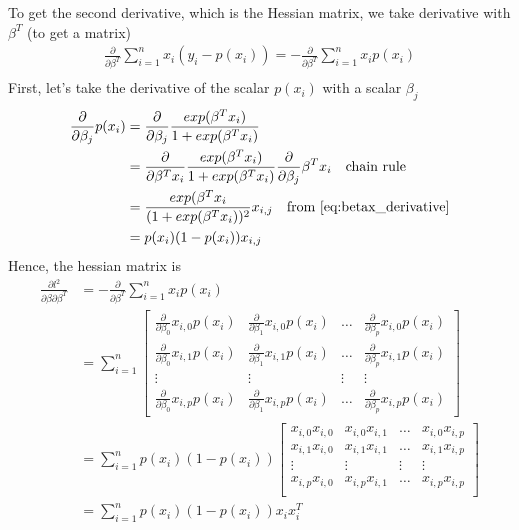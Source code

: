 \documentclass[../statistical_learning_notes.tex]{subfiles}
\begin{document}
To get the second derivative, which is the Hessian matrix, we take derivative with $\beta^{T}$ (to get a matrix)
\begin{gather*}
    \frac{\partial}{\partial \beta^{T}} \sum_{i=1}^{n} x_{i}(y_{i} - p(x_{i})) =-\frac{\partial}{\partial \beta^{T}} \sum_{i=1}^{n} x_{i}p(x_{i}) \\
\end{gather*}
First, let's take the derivative of the scalar $p(x_{i})$ with a scalar $\beta_{j}$
\begin{align*}
    \frac{\partial}{\partial \beta_{j}} p(x_{i}) &= \frac{\partial}{\partial \beta_{j}} \frac{exp(\beta^{T}x_{i})}{1 + exp(\beta^{T}x_{i})}\\
    &= \frac{\partial}{\partial \beta^{T}x_{i}} \frac{exp(\beta^{T}x_{i})}{1 + exp(\beta^{T}x_{i})} \frac{\partial}{\partial \beta_{j}} \beta^{T}x_{i} \quad \text{chain rule}\\
    &= \frac{exp(\beta^{T}x_{i}}{(1 + exp(\beta^{T}x_{i}))^{2}} x_{i,j} \quad \text{from \ref{eq:betax_derivative}}\\
    &= p(x_{i})(1-p(x_{i}))x_{i,j}
\end{align*}
Hence, the hessian matrix is
\begin{align*}
    \frac{\partial l^{2}}{\partial \beta \partial \beta^{T}} &= -\frac{\partial}{\partial \beta^{T}} \sum_{i=1}^{n} x_{i}p(x_{i})\\
    &= \sum_{i=1}^{n}
    \begin{bmatrix}
        \frac{\partial}{\partial \beta_{0}} x_{i,0}p(x_{i}) &\frac{\partial}{\partial \beta_{1}} x_{i,0}p(x_{i}) &\ldots &\frac{\partial}{\partial \beta_{p}} x_{i,0}p(x_{i})\\
        \frac{\partial}{\partial \beta_{0}} x_{i,1}p(x_{i}) &\frac{\partial}{\partial \beta_{1}} x_{i,1}p(x_{i}) &\ldots &\frac{\partial}{\partial \beta_{p}} x_{i,1}p(x_{i})\\
        \vdots &\vdots &\vdots &\vdots\\
        \frac{\partial}{\partial \beta_{0}} x_{i,p}p(x_{i}) &\frac{\partial}{\partial \beta_{1}} x_{i,p}p(x_{i}) &\ldots &\frac{\partial}{\partial \beta_{p}} x_{i,p}p(x_{i})
    \end{bmatrix}\\
    &= \sum_{i=1}^{n} p(x_{i})(1-p(x_{i}))
    \begin{bmatrix}
        x_{i,0}x_{i,0} &x_{i,0}x_{i,1} &\ldots & x_{i,0}x_{i,p}\\
        x_{i,1}x_{i,0} &x_{i,1}x_{i,1} &\ldots & x_{i,1}x_{i,p}\\
        \vdots &\vdots &\vdots &\vdots\\
        x_{i,p}x_{i,0} &x_{i,p}x_{i,1} &\ldots & x_{i,p}x_{i,p}\\
    \end{bmatrix}\\
    &= \sum_{i=1}^{n} p(x_{i})(1-p(x_{i})) x_{i}x_{i}^{T}
\end{align*}
\end{document}
